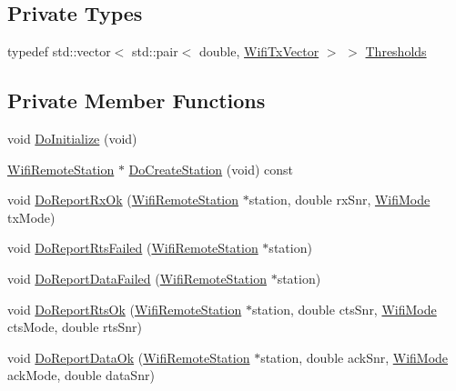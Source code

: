 \subsection*{Private Types}
\begin{DoxyCompactItemize}
\item 
typedef std\+::vector$<$ std\+::pair$<$ double, \hyperlink{classns3_1_1WifiTxVector}{Wifi\+Tx\+Vector} $>$ $>$ \hyperlink{classns3_1_1IdealWifiManager_ae4c6d6e6edd816faeb30a2f010eec7d7}{Thresholds}
\end{DoxyCompactItemize}
\subsection*{Private Member Functions}
\begin{DoxyCompactItemize}
\item 
void \hyperlink{classns3_1_1IdealWifiManager_a678947f49366ca1734b6299b667845da}{Do\+Initialize} (void)
\item 
\hyperlink{structns3_1_1WifiRemoteStation}{Wifi\+Remote\+Station} $\ast$ \hyperlink{classns3_1_1IdealWifiManager_a9918be4b33fc15e50743ead9bb5a8d17}{Do\+Create\+Station} (void) const 
\item 
void \hyperlink{classns3_1_1IdealWifiManager_ab970bb587d9ff4913983e9120600b5d9}{Do\+Report\+Rx\+Ok} (\hyperlink{structns3_1_1WifiRemoteStation}{Wifi\+Remote\+Station} $\ast$station, double rx\+Snr, \hyperlink{classns3_1_1WifiMode}{Wifi\+Mode} tx\+Mode)
\item 
void \hyperlink{classns3_1_1IdealWifiManager_a517e8e8d340df21fde394236daae107e}{Do\+Report\+Rts\+Failed} (\hyperlink{structns3_1_1WifiRemoteStation}{Wifi\+Remote\+Station} $\ast$station)
\item 
void \hyperlink{classns3_1_1IdealWifiManager_aa9f4a7d3ed8e58cb7a5d0c1d312c0ce9}{Do\+Report\+Data\+Failed} (\hyperlink{structns3_1_1WifiRemoteStation}{Wifi\+Remote\+Station} $\ast$station)
\item 
void \hyperlink{classns3_1_1IdealWifiManager_a3baa107493052456308092dd737f94a0}{Do\+Report\+Rts\+Ok} (\hyperlink{structns3_1_1WifiRemoteStation}{Wifi\+Remote\+Station} $\ast$station, double cts\+Snr, \hyperlink{classns3_1_1WifiMode}{Wifi\+Mode} cts\+Mode, double rts\+Snr)
\item 
void \hyperlink{classns3_1_1IdealWifiManager_a80a9c2d8cda6728bc2ae4a12096a33c1}{Do\+Report\+Data\+Ok} (\hyperlink{structns3_1_1WifiRemoteStation}{Wifi\+Remote\+Station} $\ast$station, double ack\+Snr, \hyperlink{classns3_1_1WifiMode}{Wifi\+Mode} ack\+Mode, double data\+Snr)

\end{DoxyCompactItemize}
